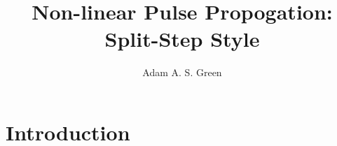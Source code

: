 \documentclass[12pt]{article}
\title{Non-linear Pulse Propogation: Split-Step Style}
\author{Adam A. S. Green}
\begin{document}

\maketitle
\section{Introduction}
\end{document}
